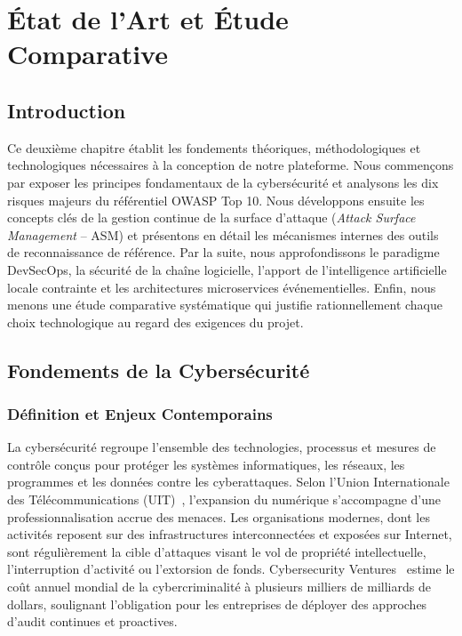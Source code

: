\chapter{\'Etat de l'Art et \'Etude Comparative}
\label{chap:etat_art}

\section*{Introduction}
\par Ce deuxi\`eme chapitre \'etablit les fondements th\'eoriques, m\'ethodologiques et technologiques n\'ecessaires \`a la conception de notre plateforme. Nous commen\c{c}ons par exposer les principes fondamentaux de la cybers\'ecurit\'e et analysons les dix risques majeurs du r\'ef\'erentiel OWASP Top 10. Nous d\'eveloppons ensuite les concepts cl\'es de la gestion continue de la surface d'attaque (\textit{Attack Surface Management} -- ASM) et pr\'esentons en d\'etail les m\'ecanismes internes des outils de reconnaissance de r\'ef\'erence. Par la suite, nous approfondissons le paradigme DevSecOps, la s\'ecurit\'e de la cha\^ine logicielle, l'apport de l'intelligence artificielle locale contrainte et les architectures microservices \'ev\'enementielles. Enfin, nous menons une \'etude comparative syst\'ematique qui justifie rationnellement chaque choix technologique au regard des exigences du projet.

\section{Fondements de la Cybers\'ecurit\'e}
\subsection{D\'efinition et Enjeux Contemporains}
\par La cybers\'ecurit\'e regroupe l'ensemble des technologies, processus et mesures de contr\^ole con\c{c}us pour prot\'eger les syst\`emes informatiques, les r\'eseaux, les programmes et les donn\'ees contre les cyberattaques. Selon l'Union Internationale des T\'el\'ecommunications (UIT)~\cite{itu}, l'expansion du num\'erique s'accompagne d'une professionnalisation accrue des menaces. Les organisations modernes, dont les activit\'es reposent sur des infrastructures interconnect\'ees et expos\'ees sur Internet, sont r\'eguli\`erement la cible d'attaques visant le vol de propri\'et\'e intellectuelle, l'interruption d'activit\'e ou l'extorsion de fonds. Cybersecurity Ventures~\cite{cyberventures} estime le co\^ut annuel mondial de la cybercriminalit\'e \`a plusieurs milliers de milliards de dollars, soulignant l'obligation pour les entreprises de d\'eployer des approches d'audit continues et proactives.

